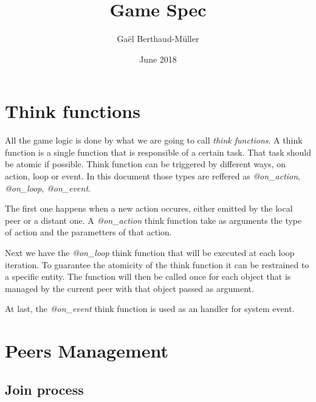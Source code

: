 \documentclass{article}
\title{Game Spec}
\author{Gaël Berthaud-Müller}
\date{June 2018}
\begin{document}
\maketitle
\tableofcontents
\newpage
\section{Think functions}

All the game logic is done by what we are going to call \textit{think functions}. A think function is a single function that is responsible of a certain task. That task should be atomic if possible.
Think function can be triggered by different ways, on action, loop or event. In this document those types are reffered as \textit{@on\_action}, \textit{@on\_loop}, \textit{@on\_event}.

The first one happens when a new action occures, either emitted by the local peer or a distant one. A \textit{@on\_action} think function take as arguments the type of action and the parametters of that action.

Next we have the \textit{@on\_loop} think function that will be executed at each loop iteration. To guarantee the atomicity of the think function it can be restrained to a specific entity. The function will then be called once for each object that is managed by the current peer with that object passed as argument.

At last, the \textit{@on\_event} think function is used as an handler for system event.
\section{Peers Management}
\subsection{Join process}
\end{document}
